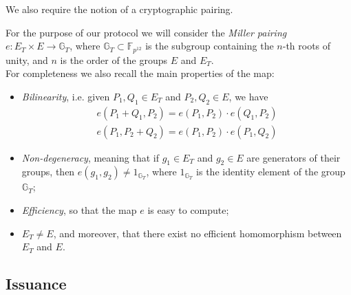 We also require the notion of a cryptographic pairing. \cite{weilpair}

For the purpose of our protocol we will consider the \emph{Miller
pairing} $e: E_T \times E\to \mathbb{G}_T$, where $\mathbb{G}_T\subset
\mathbb{F}_{p^{12}}$ is the subgroup containing the $n$-th roots of
unity, and $n$ is the order of the groups $E$ and $E_T$.\\ For
completeness we also recall the main properties of the map:

\begin{itemize}

\item [i.] \emph{Bilinearity}, i.e. given $P_1,Q_1\in E_T$
  and $P_2,Q_2\in E$, we have
  \begin{align*}
    e(P_1+Q_1,P_2) = e(P_1,P_2)\cdot e(Q_1,P_2)   \\
    e(P_1,P_2+Q_2) = e(P_1,P_2)\cdot e(P_1,Q_2)
  \end{align*}

\item[ii.] \emph{Non-degeneracy}, meaning that if $g_1\in E_T$
  and $g_2\in E$ are generators of their groups, then
  $e(g_1,g_2)\ne 1_{\mathbb{G}_T}$, where
  $1_{\mathbb{G}_T}$ is the identity element of the group
  $\mathbb{G}_T$;

\item[iii.] \emph{ Efficiency}, so that the map $e$ is easy to
  compute;

\item[iv. ] $E_T \ne E$, and moreover, that
  there exist no efficient homomorphism between $E_T$ and
  $E$.

\end{itemize}



\subsection{Issuance} \label{issuance}

